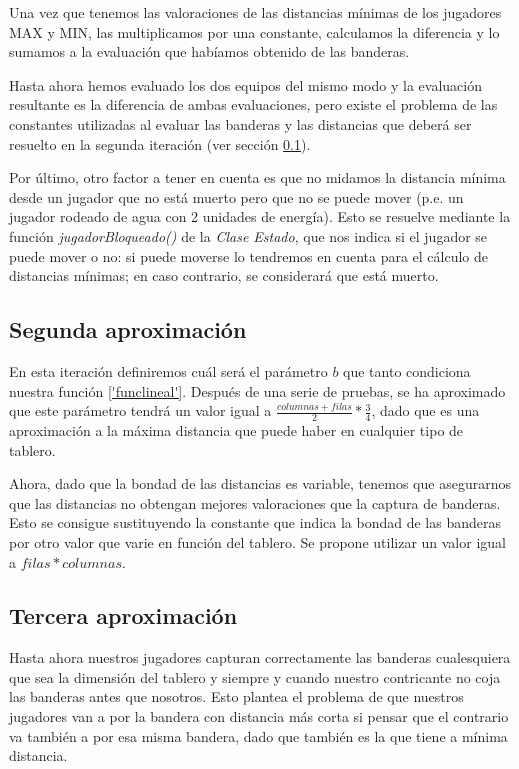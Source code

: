 Una vez que tenemos las valoraciones de las distancias mínimas de los
jugadores MAX y MIN, las multiplicamos por una constante, calculamos
la diferencia y lo sumamos a la evaluación que habíamos obtenido de
las banderas. 

Hasta ahora hemos evaluado los dos equipos del mismo modo y la
evaluación resultante es la diferencia de ambas evaluaciones, pero
existe el problema de las constantes utilizadas al evaluar las
banderas y las distancias que deberá ser resuelto en la segunda
iteración (ver sección \ref{sec:bondades}).

Por último, otro factor a tener en cuenta es que no midamos la
distancia mínima desde un jugador que no está muerto pero que no se
puede mover (p.e. un jugador rodeado de agua con 2 unidades de
energía). Esto se resuelve mediante la función
\emph{jugadorBloqueado()} de la \emph{Clase Estado}, que nos indica si
el jugador se puede mover o no: si puede moverse lo tendremos en
cuenta para el cálculo de distancias mínimas; en caso contrario, se
considerará que está muerto.


\subsection {Segunda aproximación}
\label{sec:bondades}
En esta iteración definiremos cuál será el parámetro $b$ que tanto
condiciona nuestra función \ref{'funclineal'}. Después de una serie de
pruebas, se ha aproximado que este parámetro tendrá un valor igual a
$\frac{columnas+filas}{2}*\frac{3}{4}$, dado que es una aproximación a
la máxima distancia que puede haber en cualquier tipo de tablero.

Ahora, dado que la bondad de las distancias es variable, tenemos que
asegurarnos que las distancias no obtengan mejores valoraciones que la
captura de banderas. Esto se consigue sustituyendo la constante que
indica la bondad de las banderas por otro valor que varie en función
del tablero. Se propone utilizar un valor igual a $filas*columnas$.


\subsection {Tercera aproximación}
\label{sec:blacklist}
Hasta ahora nuestros jugadores capturan correctamente las banderas
cualesquiera que sea la dimensión del tablero y siempre y cuando
nuestro contricante no coja las banderas antes que nosotros. Esto
plantea el problema de que nuestros jugadores van a por la bandera con
distancia más corta si pensar que el contrario va también a por esa misma
bandera, dado que también es la que tiene a mínima distancia.

